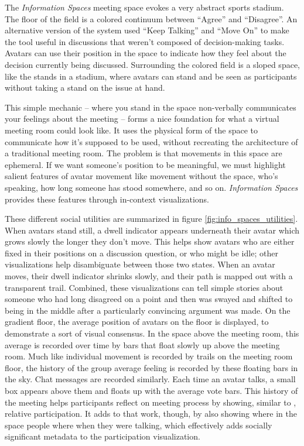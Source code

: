 \documentclass{tufte-handout}
\begin{document}
The \emph{Information Spaces} meeting space evokes a very abstract sports stadium. The floor of the field is a colored continuum between ``Agree'' and ``Disagree''. An alternative version of the system used ``Keep Talking'' and ``Move On'' to make the tool useful in discussions that weren't composed of decision-making tasks. Avatars can use their position in the space to indicate how they feel about the decision currently being discussed. Surrounding the colored field is a sloped space, like the stands in a stadium, where avatars can stand and be seen as participants without taking a stand on the issue at hand.

This simple mechanic -- where you stand in the space non-verbally communicates your feelings about the meeting -- forms a nice foundation for what a virtual meeting room could look like. It uses the physical form of the space to communicate how it's supposed to be used, without recreating the architecture of a traditional meeting room. The problem is that movements in this space are ephemeral. If we want someone's position to be meaningful, we must highlight salient features of avatar movement like movement without the space, who's speaking, how long someone has stood somewhere, and so on. \emph{Information Spaces} provides these features through in-context visualizations.

These different social utilities are summarized in figure \ref{fig:info_spaces_utilities}. When avatars stand still, a dwell indicator appears underneath their avatar which grows slowly the longer they don't move. This helps show avatars who are either fixed in their positions on a discussion question, or who might be idle; other visualizations help disambiguate between those two states. When an avatar moves, their dwell indicator shrinks slowly, and their path is mapped out with a transparent trail. Combined, these visualizations can tell simple stories about someone who had long disagreed on a point and then was swayed and shifted to being in the middle after a particularly convincing argument was made. On the gradient floor, the average position of avatars on the floor is displayed, to demonstrate a sort of visual consensus. In the space above the meeting room, this average is recorded over time by bars that float slowly up above the meeting room. Much like individual movement is recorded by trails on the meeting room floor, the history of the group average feeling is recorded by these floating bars in the sky. Chat messages are recorded similarly. Each time an avatar talks, a small box appears above them and floats up with the average vote bars. This history of the meeting helps participants reflect on meeting process by showing, similar to \citet{second_messenger}, relative participation. It adds to that work, though, by also showing where in the space people where when they were talking, which effectively adds socially significant metadata to the participation visualization.
\end{document}
